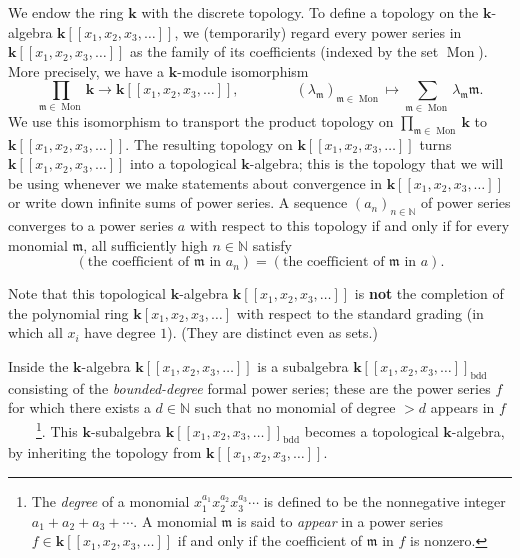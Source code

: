 \documentclass[numbers=enddot,12pt,final,onecolumn,notitlepage,abstracton]{scrartcl}
\theoremstyle{definition}
\let\sumnonlimits\sum
\let\prodnonlimits\prod
\renewcommand{\sum}{\sumnonlimits\limits}
\renewcommand{\prod}{\prodnonlimits\limits}
\newcommand{\kk}{{\mathbf{k}}}
\newcommand{\Mon}{\operatorname{Mon}}
\newcommand{\Powser}{\mathbf{k}\left[\left[x_1,x_2,x_3,\ldots\right]\right]}
\newcommand{\bdd}{\operatorname{bdd}}
\newcommand{\NN}{{\mathbb{N}}}
\begin{document}
{We endow the ring $\kk$ with the discrete topology. To define a
topology on the $\kk$-algebra $\Powser$, we (temporarily) regard every power
series in $\Powser$ as the family of its coefficients (indexed by the
set $\Mon$). More precisely, we have a
$\kk$-module isomorphism
\[
\prod_{\mathfrak{m} \in  \Mon } \kk \to \Powser,
\qquad \qquad \left(\lambda_{\mathfrak{m}}\right)_{\mathfrak{m} \in  \Mon }
\mapsto \sum_{\mathfrak{m} \in  \Mon } \lambda_{\mathfrak{m}} \mathfrak{m} .
\]
We use this isomorphism to transport the product topology on
$\prod_{\mathfrak{m} \in  \Mon } \kk$ to $\Powser$. The
resulting topology on $\Powser$ turns $\Powser$ into a topological
$\kk$-algebra; this is the topology that we will
be using whenever we make statements about convergence in $\Powser$
or write down infinite sums of power series.
A sequence $\left( a_n \right)_{n \in \NN}$ of power series converges
to a power series $a$ with respect to this topology if
and only if for every monomial $\mathfrak{m}$, all sufficiently high
$n \in \NN$ satisfy
\[
\left(  \text{the coefficient of } \mathfrak{m}\text{ in }a_{n}\right)
=\left(  \text{the coefficient of } \mathfrak{m}\text{ in }a\right)  .
\]

Note that this topological $\kk$-algebra $\Powser$ is \textbf{not}
the completion of the polynomial ring
$\kk \left[  x_{1},x_{2},x_{3},\ldots\right]$
with respect to the standard grading (in which all $x_{i}$ have degree $1$).
(They are distinct even as sets.)
}

Inside the $\kk$-algebra $\Powser$ is a
subalgebra $\Powser_{\bdd}$ consisting of the \textit{bounded-degree}
formal power series; these are the power series $f$ for which there
exists a $d \in \NN$ such that no monomial of degree $> d$ appears in
$f$\ \ \ \ \footnote{The \textit{degree} of a monomial
$x_1^{a_1} x_2^{a_2} x_3^{a_3} \cdots$ is defined to be the nonnegative
integer $a_1 + a_2 + a_3 + \cdots$. A monomial $\mathfrak{m}$ is said
to \textit{appear} in a power series $f \in \Powser$ if and only if
the coefficient of $\mathfrak{m}$ in $f$ is nonzero.}.
This $\kk$-subalgebra $\Powser_{\bdd}$ becomes a topological
$\kk$-algebra, by inheriting the topology from $\Powser$.
\end{document}
